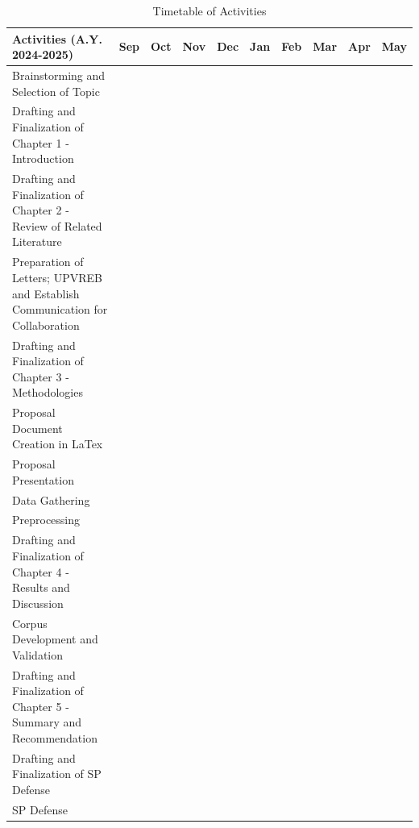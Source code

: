 \begin{table}[ht]   %
\centering
\caption{Timetable of Activities} \vspace{0.25em}
\begin{tabular}{|p{2in}|c|c|c|c|c|c|c|c|c|} \hline
\centering Activities (A.Y. 2024-2025) 														& Sep & Oct  & Nov & Dec & Jan & Feb & Mar & Apr & May \\ \hline
Brainstorming and Selection of Topic      													& \weekone & \weektwo &  &  &  &  &  &  & \\ \hline
Drafting and Finalization of Chapter 1 - Introduction 										&  & \weektwo & \weekone &  &  &  &  &  & \\ \hline
Drafting and Finalization of Chapter 2 - Review of Related Literature      					&   &  & \weekthree &  &  &  &  &  &  \\ \hline
Preparation of Letters; UPVREB and Establish Communication for Collaboration     			&   & \weekone &  &  &  &  &  &  &  \\ \hline
Drafting and Finalization of Chapter 3 - Methodologies      								&   &  & \weekone & \weektwo &  &  &  &  &   \\ \hline
Proposal Document Creation in LaTex 														&   &  & \weekone & \weekone &  &  &  &  &  \\ \hline
Proposal Presentation 																		&   &  &  & \weekone &  &  &  &  & \\ \hline
Data Gathering 																				&   &  &  & \weekthree & \weekthree  &  &  &  & \\ \hline
Preprocessing 																				&   &  &  &  &  \weekone  & \weekthree &  &  &  \\ \hline
Drafting and Finalization of Chapter 4 - Results and Discussion 							&   &  &  &  &  & \weekone & \weektwo &  &  \\ \hline
Corpus Development and Validation															&   &  &  &  &  &  & \weekthree & \weekthree &  \\ \hline
Drafting and Finalization of Chapter 5 - Summary and Recommendation							&   &  &  &  &  &  &  & \weektwo & \weektwo \\ \hline
Drafting and Finalization of SP Defense														&   &  &  &  &  &  &  &  & \weekone \\ \hline
SP Defense																					&   &  &  &  &  &  &  &  & \weekone \\ \hline
	
\end{tabular}
\label{tab:timetableactivities}
\end{table}

